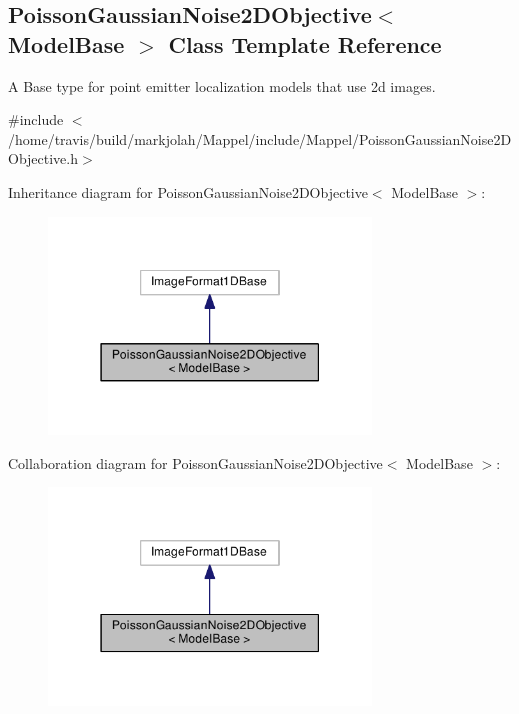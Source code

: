 \hypertarget{classPoissonGaussianNoise2DObjective}{}\subsection{Poisson\+Gaussian\+Noise2\+D\+Objective$<$ Model\+Base $>$ Class Template Reference}
\label{classPoissonGaussianNoise2DObjective}


A Base type for point emitter localization models that use 2d images.  




{\ttfamily \#include $<$/home/travis/build/markjolah/\+Mappel/include/\+Mappel/\+Poisson\+Gaussian\+Noise2\+D\+Objective.\+h$>$}



Inheritance diagram for Poisson\+Gaussian\+Noise2\+D\+Objective$<$ Model\+Base $>$\+:\nopagebreak
\begin{figure}[H]
\begin{center}
\leavevmode
\includegraphics[width=243pt]{classPoissonGaussianNoise2DObjective__inherit__graph}
\end{center}
\end{figure}


Collaboration diagram for Poisson\+Gaussian\+Noise2\+D\+Objective$<$ Model\+Base $>$\+:\nopagebreak
\begin{figure}[H]
\begin{center}
\leavevmode
\includegraphics[width=243pt]{classPoissonGaussianNoise2DObjective__coll__graph}
\end{center}
\end{figure}
